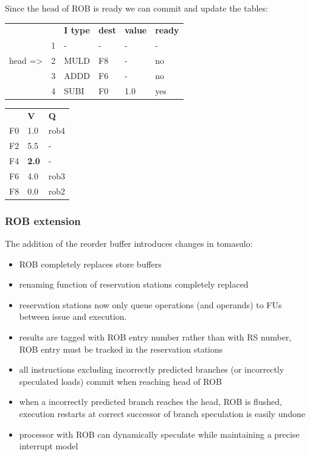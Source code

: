 Since the head of ROB is ready we can commit and update the tables:

\begin{table}[H]
    \centering
    \begin{tabular}{llllll}
        & & \textbf{I type} & \textbf{dest} & \textbf{value} & \textbf{ready}  \\
        & 1 & - & - & - & - \\
        head => & 2 & MULD & F8 & - & no \\
        & 3 & ADDD & F6 & - & no \\
        & 4 & SUBI & F0 & 1.0 & yes \\
    \end{tabular}
    \label{tab:rob-example2}
\end{table}

\begin{table}[H]
    \centering
    \begin{tabular}{l|ll}
        \textbf{} & \textbf{V} & \textbf{Q} \\
        F0 & 1.0 & rob4 \\
        F2 & 5.5 & - \\
        F4 & \textbf{2.0} & - \\
        F6 & 4.0 & rob3 \\
        F8 & 0.0 & rob2 \\
    \end{tabular}
    \label{tab:register-file-with-rob2}
\end{table}

\subsubsection{ROB extension}
The addition of the reorder buffer introduces changes in tomasulo:
\begin{itemize}[noitemsep]
    \item ROB completely replaces store buffers
    \item renaming function of reservation stations completely replaced
    \item reservation stations now only queue operations (and operands) to FUs between issue and execution.
    \item results are tagged with ROB entry number rather than with RS number, ROB entry must be tracked in the
    reservation stations
    \item all instructions excluding incorrectly predicted branches (or incorrectly speculated loads) commit when
    reaching head of ROB
    \item when a incorrectly predicted branch reaches the head, ROB is flushed, execution restarts at correct
    successor of branch \textrightarrow speculation is easily undone
    \item processor with ROB can dynamically speculate while maintaining a precise interrupt model
\end{itemize}

